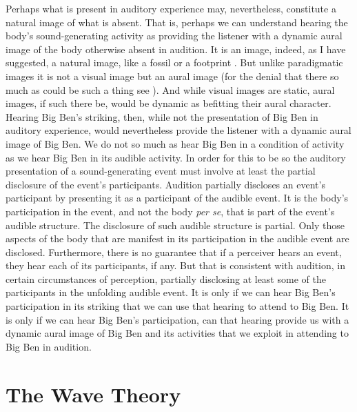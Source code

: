 Perhaps what is present in auditory experience may, nevertheless, constitute a natural image of what is absent. That is, perhaps we can understand hearing the body's sound-generating activity as providing the listener with a dynamic aural image of the body otherwise absent in audition. It is an image, indeed, as I have suggested, a natural image, like a fossil or a footprint \citep[for a recent general discussion of images see][]{Kulvicki:2014hb}. But unlike paradigmatic images it is not a visual image but an aural image (for the denial that there so much as could be such a thing see \citealt{Martin:2012af}). And while visual images are static, aural images, if such there be, would be dynamic as befitting their aural character. Hearing Big Ben's striking, then, while not the presentation of Big Ben in auditory experience, would nevertheless provide the listener with a dynamic aural image of Big Ben. We do not so much as hear Big Ben in a condition of activity as we hear Big Ben in its audible activity. In order for this to be so the auditory presentation of a sound-generating event must involve at least the partial disclosure of the event's participants. Audition partially discloses an event's participant by presenting it as a participant of the audible event. It is the body's participation in the event, and not the body \emph{per se}, that is part of the event's audible structure. The disclosure of such audible structure is partial. Only those aspects of the body that are manifest in its participation in the audible event are disclosed. Furthermore, there is no guarantee that if a perceiver hears an event, they hear each of its participants, if any. But that is consistent with audition, in certain circumstances of perception, partially disclosing at least some of the participants in the unfolding audible event. It is only if we can hear Big Ben's participation in its striking that we can use that hearing to attend to Big Ben. It is only if we can hear Big Ben's participation, can that hearing provide us with a dynamic aural image of Big Ben and its activities that we exploit in attending to Big Ben in audition.

\section{The Wave Theory} %
\label{sec:the_wave_theory}

